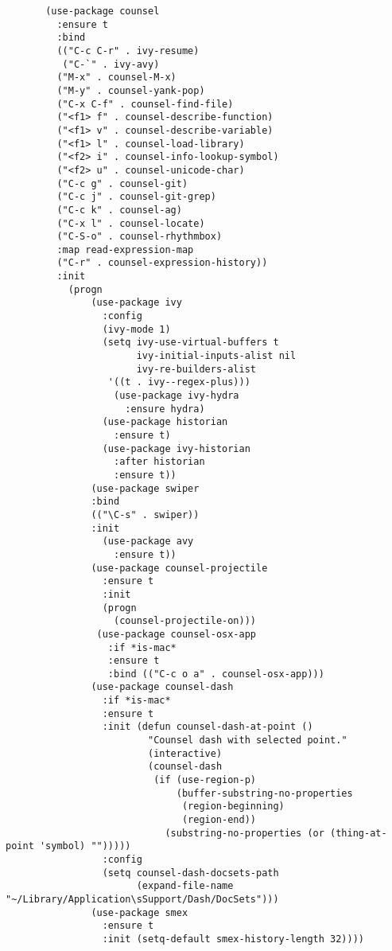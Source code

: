 \documentclass[11pt]{article}
\begin{document}
\begin{verbatim}
       (use-package counsel
         :ensure t
         :bind
         (("C-c C-r" . ivy-resume)
          ("C-`" . ivy-avy)
         ("M-x" . counsel-M-x)
         ("M-y" . counsel-yank-pop)
         ("C-x C-f" . counsel-find-file)
         ("<f1> f" . counsel-describe-function)
         ("<f1> v" . counsel-describe-variable)
         ("<f1> l" . counsel-load-library)
         ("<f2> i" . counsel-info-lookup-symbol)
         ("<f2> u" . counsel-unicode-char)
         ("C-c g" . counsel-git)
         ("C-c j" . counsel-git-grep)
         ("C-c k" . counsel-ag)
         ("C-x l" . counsel-locate)
         ("C-S-o" . counsel-rhythmbox)
         :map read-expression-map
         ("C-r" . counsel-expression-history))
         :init
           (progn
               (use-package ivy
                 :config
                 (ivy-mode 1)
                 (setq ivy-use-virtual-buffers t
                       ivy-initial-inputs-alist nil
                       ivy-re-builders-alist
             	  '((t . ivy--regex-plus)))
                   (use-package ivy-hydra
                     :ensure hydra)
                 (use-package historian
                   :ensure t)
                 (use-package ivy-historian
                   :after historian 
                   :ensure t))
               (use-package swiper
               :bind
               (("\C-s" . swiper))
               :init
                 (use-package avy
                   :ensure t))
               (use-package counsel-projectile
                 :ensure t
                 :init
                 (progn
                   (counsel-projectile-on)))
                (use-package counsel-osx-app
                  :if *is-mac*
                  :ensure t
                  :bind (("C-c o a" . counsel-osx-app)))
               (use-package counsel-dash
                 :if *is-mac*
                 :ensure t
                 :init (defun counsel-dash-at-point ()
                         "Counsel dash with selected point."
                         (interactive)
                         (counsel-dash
                          (if (use-region-p)
                              (buffer-substring-no-properties
                               (region-beginning)
                               (region-end))
                            (substring-no-properties (or (thing-at-point 'symbol) "")))))
                 :config
                 (setq counsel-dash-docsets-path
                       (expand-file-name "~/Library/Application\sSupport/Dash/DocSets")))
               (use-package smex
                 :ensure t
                 :init (setq-default smex-history-length 32))))
\end{verbatim}
\end{document}
